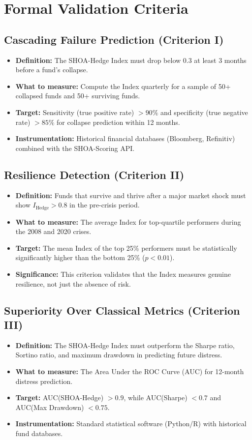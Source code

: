 \documentclass[12pt]{article}
\begin{document}
\section{Formal Validation Criteria}

\subsection{Cascading Failure Prediction (Criterion I)}
\begin{itemize}
    \item \textbf{Definition:} The SHOA-Hedge Index must drop below 0.3 at least 3 months before a fund's collapse.
    \item \textbf{What to measure:} Compute the Index quarterly for a sample of 50+ collapsed funds and 50+ surviving funds.
    \item \textbf{Target:} Sensitivity (true positive rate) $> 90\%$ and specificity (true negative rate) $> 85\%$ for collapse prediction within 12 months.
    \item \textbf{Instrumentation:} Historical financial databases (Bloomberg, Refinitiv) combined with the SHOA-Scoring API.
\end{itemize}

\subsection{Resilience Detection (Criterion II)}
\begin{itemize}
    \item \textbf{Definition:} Funds that survive and thrive after a major market shock must show $I_{\text{Hedge}} > 0.8$ in the pre-crisis period.
    \item \textbf{What to measure:} The average Index for top-quartile performers during the 2008 and 2020 crises.
    \item \textbf{Target:} The mean Index of the top 25\% performers must be statistically significantly higher than the bottom 25\% ($p < 0.01$).
    \item \textbf{Significance:} This criterion validates that the Index measures genuine resilience, not just the absence of risk.
\end{itemize}

\subsection{Superiority Over Classical Metrics (Criterion III)}
\begin{itemize}
    \item \textbf{Definition:} The SHOA-Hedge Index must outperform the Sharpe ratio, Sortino ratio, and maximum drawdown in predicting future distress.
    \item \textbf{What to measure:} The Area Under the ROC Curve (AUC) for 12-month distress prediction.
    \item \textbf{Target:} AUC(SHOA-Hedge) $> 0.9$, while AUC(Sharpe) $< 0.7$ and AUC(Max Drawdown) $< 0.75$.
    \item \textbf{Instrumentation:} Standard statistical software (Python/R) with historical fund databases.
\end{itemize}
\end{document}
